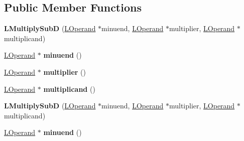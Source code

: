 \subsection*{Public Member Functions}
\begin{DoxyCompactItemize}
\item 
{\bfseries L\+Multiply\+SubD} (\hyperlink{classv8_1_1internal_1_1_l_operand}{L\+Operand} $\ast$minuend, \hyperlink{classv8_1_1internal_1_1_l_operand}{L\+Operand} $\ast$multiplier, \hyperlink{classv8_1_1internal_1_1_l_operand}{L\+Operand} $\ast$multiplicand)\hypertarget{classv8_1_1internal_1_1_l_multiply_sub_d_a66414bb6cbf154e8fece734e80bb8417}{}\label{classv8_1_1internal_1_1_l_multiply_sub_d_a66414bb6cbf154e8fece734e80bb8417}

\item 
\hyperlink{classv8_1_1internal_1_1_l_operand}{L\+Operand} $\ast$ {\bfseries minuend} ()\hypertarget{classv8_1_1internal_1_1_l_multiply_sub_d_adf13d3353a2816162ee757c048c97198}{}\label{classv8_1_1internal_1_1_l_multiply_sub_d_adf13d3353a2816162ee757c048c97198}

\item 
\hyperlink{classv8_1_1internal_1_1_l_operand}{L\+Operand} $\ast$ {\bfseries multiplier} ()\hypertarget{classv8_1_1internal_1_1_l_multiply_sub_d_a219c72ff0d421c44a18ee889f22ec219}{}\label{classv8_1_1internal_1_1_l_multiply_sub_d_a219c72ff0d421c44a18ee889f22ec219}

\item 
\hyperlink{classv8_1_1internal_1_1_l_operand}{L\+Operand} $\ast$ {\bfseries multiplicand} ()\hypertarget{classv8_1_1internal_1_1_l_multiply_sub_d_a8bf065db7745a2a47be05c7a17082272}{}\label{classv8_1_1internal_1_1_l_multiply_sub_d_a8bf065db7745a2a47be05c7a17082272}

\item 
{\bfseries L\+Multiply\+SubD} (\hyperlink{classv8_1_1internal_1_1_l_operand}{L\+Operand} $\ast$minuend, \hyperlink{classv8_1_1internal_1_1_l_operand}{L\+Operand} $\ast$multiplier, \hyperlink{classv8_1_1internal_1_1_l_operand}{L\+Operand} $\ast$multiplicand)\hypertarget{classv8_1_1internal_1_1_l_multiply_sub_d_a66414bb6cbf154e8fece734e80bb8417}{}\label{classv8_1_1internal_1_1_l_multiply_sub_d_a66414bb6cbf154e8fece734e80bb8417}

\item 
\hyperlink{classv8_1_1internal_1_1_l_operand}{L\+Operand} $\ast$ {\bfseries minuend} ()\hypertarget{classv8_1_1internal_1_1_l_multiply_sub_d_adf13d3353a2816162ee757c048c97198}{}\label{classv8_1_1internal_1_1_l_multiply_sub_d_adf13d3353a2816162ee757c048c97198}


\end{DoxyCompactItemize}
